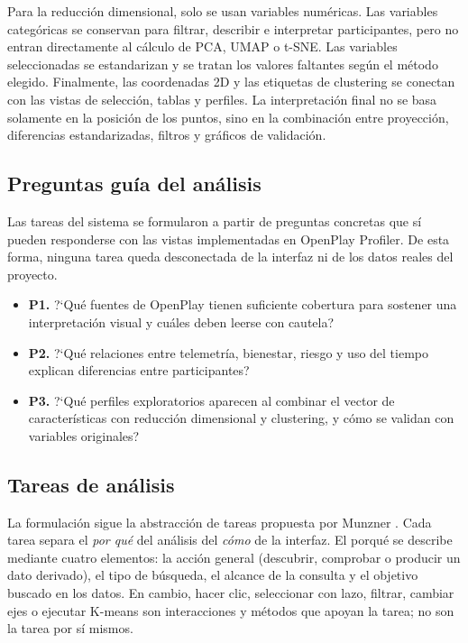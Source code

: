 \documentclass[12pt,a4paper]{article}
\begin{document}
Para la reducci\'on dimensional, solo se usan variables num\'ericas. Las variables categ\'oricas se conservan para filtrar, describir e interpretar participantes, pero no entran directamente al c\'alculo de PCA, UMAP o t-SNE. Las variables seleccionadas se estandarizan y se tratan los valores faltantes seg\'un el m\'etodo elegido. Finalmente, las coordenadas 2D y las etiquetas de clustering se conectan con las vistas de selecci\'on, tablas y perfiles. La interpretaci\'on final no se basa solamente en la posici\'on de los puntos, sino en la combinaci\'on entre proyecci\'on, diferencias estandarizadas, filtros y gr\'aficos de validaci\'on.

\subsection{Preguntas gu\'ia del an\'alisis}

Las tareas del sistema se formularon a partir de preguntas concretas que s\'i pueden responderse con las vistas implementadas en OpenPlay Profiler. De esta forma, ninguna tarea queda desconectada de la interfaz ni de los datos reales del proyecto.

\begin{itemize}
    \item \textbf{P1.} ?`Qu\'e fuentes de OpenPlay tienen suficiente cobertura para sostener una interpretaci\'on visual y cu\'ales deben leerse con cautela?
    \item \textbf{P2.} ?`Qu\'e relaciones entre telemetr\'ia, bienestar, riesgo y uso del tiempo explican diferencias entre participantes?
    \item \textbf{P3.} ?`Qu\'e perfiles exploratorios aparecen al combinar el vector de caracter\'isticas con reducci\'on dimensional y clustering, y c\'omo se validan con variables originales?
\end{itemize}

\subsection{Tareas de an\'alisis}

La formulaci\'on sigue la abstracci\'on de tareas propuesta por Munzner \cite{munzner}. Cada tarea separa el \textit{por qu\'e} del an\'alisis del \textit{c\'omo} de la interfaz. El porqu\'e se describe mediante cuatro elementos: la acci\'on general (descubrir, comprobar o producir un dato derivado), el tipo de b\'usqueda, el alcance de la consulta y el objetivo buscado en los datos. En cambio, hacer clic, seleccionar con lazo, filtrar, cambiar ejes o ejecutar K-means son interacciones y m\'etodos que apoyan la tarea; no son la tarea por s\'i mismos.
\end{document}

